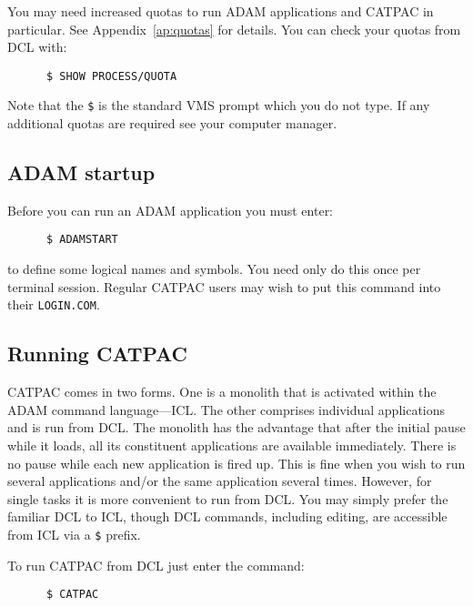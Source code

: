 You may need increased quotas to run {\small ADAM} applications and {\small
CATPAC} in particular.  See Appendix~\ref{ap:quotas} for details. You can check
your quotas from {\small DCL} with:

\begin{verbatim}
      $ SHOW PROCESS/QUOTA
\end{verbatim}

Note that the {\tt \$} is the standard VMS prompt which you do not type. If any
additional quotas are required see your computer manager. 

\subsection{ADAM startup}

Before you can run an {\small ADAM} application you must enter:

\begin{verbatim}
      $ ADAMSTART
\end{verbatim}

to define some logical names and symbols. You need only do this once per
terminal session.  Regular {\small CATPAC} users may wish to put this command
into their {\tt LOGIN.COM}.

\subsection{Running CATPAC}

{\small CATPAC} comes in two forms.  One is a monolith that is activated
within the {\small ADAM} command language---{\small ICL}.  The other
comprises individual applications and is run from {\small DCL}.  The
monolith has the advantage that after the initial pause while it loads,
all its constituent applications are available immediately.  There is no
pause while each new application is fired up.  This is fine when you
wish to run several applications and/or the same application several
times. However, for single tasks it is more convenient to run from
{\small DCL}.  You may simply prefer the familiar {\small DCL} to
{\small ICL}, though {\small DCL} commands, including editing, are
accessible from {\small ICL} via a {\tt \$} prefix. 

To run {\small CATPAC} from {\small DCL} just enter the command:

\begin{verbatim}
      $ CATPAC
\end{verbatim}

